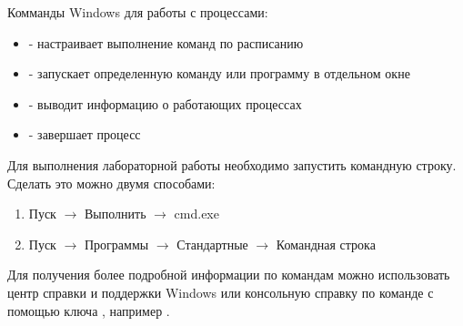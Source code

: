 \documentclass[a4paper,12pt]{article}
\begin{document}

    \begin{flushleft}
        Комманды Windows для работы с процессами:
        \begin{itemize}
            \item {} - настраивает выполнение команд по расписанию
            \item {} - запускает определенную команду или программу в отдельном окне
            \item {} - выводит информацию о работающих процессах
            \item {} - завершает процесс
        \end{itemize}
    \end{flushleft}
  
    \begin{flushleft}
        Для выполнения лабораторной работы необходимо запустить командную строку. Сделать это можно двумя способами:
        \begin{enumerate}
            \item Пуск $\to$ Выполнить $\to$ cmd.exe
            \item Пуск $\to$ Программы $\to$ Стандартные $\to$ Командная строка
        \end{enumerate}
    \end{flushleft}
  
    \begin{flushleft}
        Для получения более подробной информации по командам можно использовать центр справки и поддержки Windows или консольную справку по команде с помощью ключа , например .
    \end{flushleft}
\end{document}
